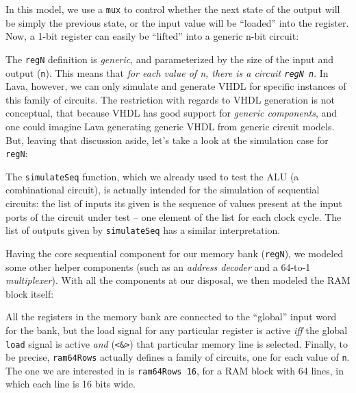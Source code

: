 \documentclass[a4paper]{article}
\begin{document}
                In this model, we use a \texttt{mux} to control whether the next state of the output
                will be simply the previous state, or the input value will be ``loaded'' into the
                register. Now, a 1-bit register can easily be ``lifted'' into a generic n-bit
                circuit:
                

                The \texttt{regN} definition is \emph{generic}, and parameterized by the size of the
                input and output (\texttt{n}). This means that \emph{for each value of n, there is a
                    circuit \texttt{regN n}}. In Lava, however, we can only simulate and generate
                VHDL for specific instances of this family of circuits. The restriction with regards
                to VHDL generation is not conceptual, that because VHDL has good support for
                \emph{generic components}, and one could imagine Lava generating generic VHDL from
                generic circuit models. But, leaving that discussion aside, let's take a look at the
                simulation case for \texttt{regN}:
                

                The \texttt{simulateSeq} function, which we already used to test the ALU (a
                combinational circuit), is actually intended for the simulation of sequential
                circuits: the list of inputs its given is the sequence of values present at the
                input ports of the circuit under test -- one element of the list for each clock
                cycle. The list of outputs given by \texttt{simulateSeq} has a similar
                interpretation.

                Having the core sequential component for our memory bank (\texttt{regN}), we modeled
                some other helper components (such as an \emph{address decoder} and a 64-to-1
                \emph{multiplexer}). With all the components at our disposal, we then modeled the
                RAM block itself:
                

                All the registers in the memory bank are connected to the ``global'' input word for
                the bank, but the load signal for any particular register is active \emph{iff} the
                global \texttt{load} signal is active \emph{and} (\texttt{<\&>}) that particular
                memory line is selected. Finally, to be precise, \texttt{ram64Rows} actually defines
                a family of circuits, one for each value of \texttt{n}. The one we are interested in
                is \texttt{ram64Rows 16}, for a RAM block with 64 lines, in which each line is 16
                bits wide.
\end{document}
